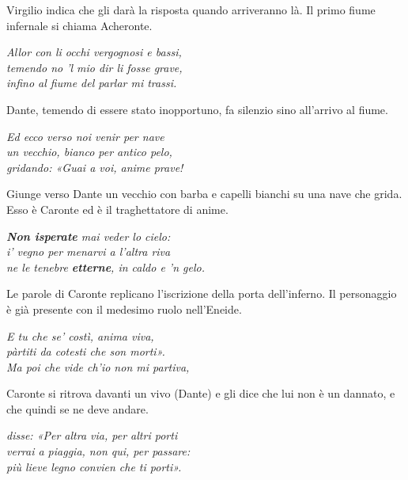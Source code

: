 \documentclass[a4paper]{article}
\begin{document}
Virgilio indica che gli darà la risposta quando arriveranno là.
Il primo fiume infernale si chiama Acheronte.

\begin{center}
    \textit{Allor con li occhi vergognosi e bassi,} \\
    \textit{temendo no 'l mio dir li fosse grave,} \\
    \textit{infino al fiume del parlar mi trassi.}
\end{center}

Dante, temendo di essere stato inopportuno, fa silenzio sino all'arrivo al fiume.

\begin{center}
    \textit{Ed ecco verso noi venir per nave} \\
    \textit{un vecchio, bianco per antico pelo,} \\
    \textit{gridando: «Guai a voi, anime prave!}
\end{center}

Giunge verso Dante un vecchio con barba e capelli bianchi su una nave che grida.
Esso è Caronte ed è il traghettatore di anime.

\begin{center}
    \textit{\textbf{Non isperate} mai veder lo cielo:} \\
    \textit{i' vegno per menarvi a l'altra riva} \\
    \textit{ne le tenebre \textbf{etterne}, in caldo e 'n gelo.}
\end{center}

Le parole di Caronte replicano l'iscrizione della porta dell'inferno.
Il personaggio è già presente con il medesimo ruolo nell'Eneide.

\begin{center}
    \textit{E tu che se' costì, anima viva,} \\
    \textit{pàrtiti da cotesti che son morti».} \\
    \textit{Ma poi che vide ch'io non mi partiva,}
\end{center}

Caronte si ritrova davanti un vivo (Dante) e gli dice che lui non è un dannato, e che quindi se ne deve andare.

\begin{center}
    \textit{disse: «Per altra via, per altri porti} \\
    \textit{verrai a piaggia, non qui, per passare:} \\
    \textit{più lieve legno convien che ti porti».}
\end{center}
\end{document}
